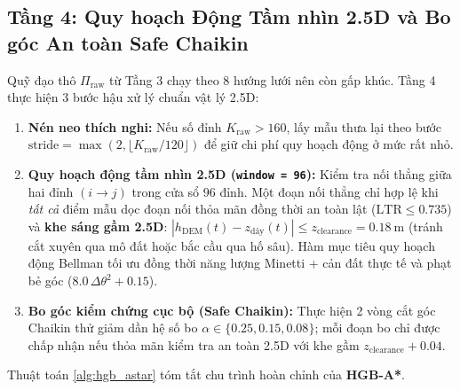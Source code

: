 \documentclass[12pt, a4paper]{article}
\begin{document}
\subsection{Tầng 4: Quy hoạch Động Tầm nhìn 2.5D và Bo góc An toàn Safe Chaikin}
Quỹ đạo thô $\Pi_{\text{raw}}$ từ Tầng 3 chạy theo 8 hướng lưới nên còn gấp khúc. Tầng 4 thực hiện 3 bước hậu xử lý chuẩn vật lý 2.5D:
\begin{enumerate}
    \item \textbf{Nén neo thích nghi:} Nếu số đỉnh $K_{\text{raw}} > 160$, lấy mẫu thưa lại theo bước $\text{stride} = \max(2, \lfloor K_{\text{raw}}/120 \rfloor)$ để giữ chi phí quy hoạch động ở mức rất nhỏ.
    \item \textbf{Quy hoạch động tầm nhìn 2.5D (\texttt{window = 96}):} Kiểm tra nối thẳng giữa hai đỉnh $(i \to j)$ trong cửa sổ $96$ đỉnh. Một đoạn nối thẳng chỉ hợp lệ khi \textit{tất cả} điểm mẫu dọc đoạn nối thỏa mãn đồng thời an toàn lật ($\text{LTR} \le 0.735$) và \textbf{khe sáng gầm 2.5D}: $|h_{\text{DEM}}(t) - z_{\text{dây}}(t)| \le z_{\text{clearance}} = 0.18\ \text{m}$ (tránh cắt xuyên qua mô đất hoặc bắc cầu qua hố sâu). Hàm mục tiêu quy hoạch động Bellman \cite{bellman1957dp} tối ưu đồng thời năng lượng Minetti + cản đất thực tế và phạt bẻ góc ($8.0\,\Delta\theta^2 + 0.15$).
    \item \textbf{Bo góc kiểm chứng cục bộ (Safe Chaikin):} Thực hiện 2 vòng cắt góc Chaikin \cite{chaikin1974} thử giảm dần hệ số bo $\alpha \in \{0.25, 0.15, 0.08\}$; mỗi đoạn bo chỉ được chấp nhận nếu thỏa mãn kiểm tra an toàn 2.5D với khe gầm $z_{\text{clearance}} + 0.04$.
\end{enumerate}

Thuật toán \ref{alg:hgb_astar} tóm tắt chu trình hoàn chỉnh của \textbf{HGB-A*}.
\end{document}
